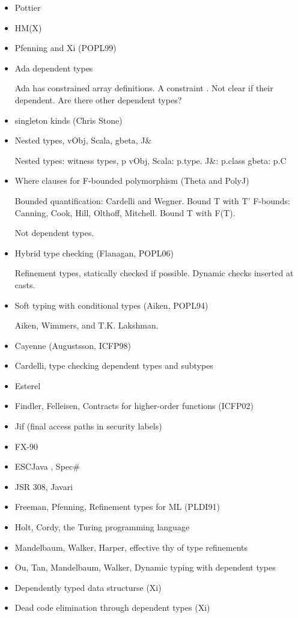 \documentclass[nocopyrightspace,preprint,10pt]{sigplanconf}
\begin{document}
\begin{itemize}
\item Pottier
\item HM(X)
\item Pfenning and Xi (POPL99)
\item Ada dependent types

Ada has constrained array definitions.  A constraint 
\cite{ada-ref-man}.  Not clear if their dependent.  Are there other dependent
types?

\item singleton kinds (Chris Stone)

\item Nested types, vObj, Scala, gbeta, J\&

Nested types: witness types, p
vObj, Scala: p.type.
J\&: p.class
gbeta: p.C

\item Where clauses for F-bounded polymorphism (Theta and PolyJ)

Bounded quantification: Cardelli and Wegner.  Bound T with T'
F-bounds: Canning, Cook, Hill, Olthoff, Mitchell.  Bound T with F(T).

Not dependent types.

\item Hybrid type checking (Flanagan, POPL06)

Refinement types, statically checked if possible.
Dynamic checks inserted at casts.

\item Soft typing with conditional types (Aiken, POPL94)

Aiken, Wimmers, and T.K. Lakshman.

\item Cayenne (Augustsson, ICFP98)
\item Cardelli, type checking dependent types and subtypes

\item Esterel

\item Findler, Felleisen, Contracts for higher-order functions (ICFP02)
\item Jif (final access paths in security labels)
\item FX-90
\item ESCJava \cite{esc-java}, Spec\#
\item JSR 308, Javari
\item Freeman, Pfenning, Refinement types for ML (PLDI91)
\item Holt, Cordy, the Turing programming language
\item Mandelbaum, Walker, Harper, effective thy of type refinements
\item Ou, Tan, Mandelbaum, Walker, Dynamic typing with dependent types
\item Dependently typed data structurse (Xi)
\item Dead code elimination through dependent types (Xi)
\end{itemize}
\end{document}
